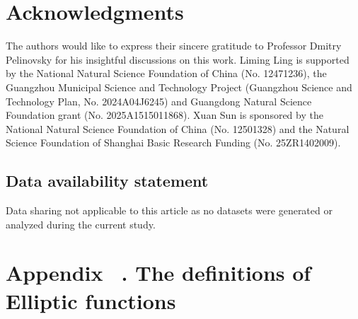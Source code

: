 \documentclass[11pt,reqno]{amsart}
\numberwithin{equation}{section}
\begin{document}
\section*{Acknowledgments}
The authors would like to express their sincere gratitude to Professor Dmitry Pelinovsky for his insightful discussions on this work.
Liming Ling is supported by the National Natural Science Foundation of China (No. 12471236), the Guangzhou Municipal Science and Technology Project (Guangzhou Science and Technology Plan, No. 2024A04J6245) and Guangdong Natural Science Foundation grant (No. 2025A1515011868).
Xuan Sun is sponsored by the National Natural Science Foundation of China (No. 12501328) and the Natural Science Foundation of Shanghai Basic Research Funding (No. 25ZR1402009).

\subsection*{Data availability statement}
Data sharing not applicable to this article as no datasets were generated or analyzed during the current study.

\appendix

\titleformat{\section}[display]
{\centering\LARGE\bfseries}{ }{11pt}{\LARGE}

\titleformat{\subsection}[display]
{\large\bfseries}{ }{10pt}{\large}

\renewcommand{\appendixname}{Appendix \, }


\section{\appendixname. The definitions of Elliptic functions}\label{appendix:Elliptic-integrals-formulas}

\setcounter{equation}{0}
\setcounter{define}{0}
\setcounter{prop}{0}
\setcounter{lemma}{0}

\renewcommand\theequation{\Alph{section}.\arabic{equation}}
\renewcommand\thedefine{\Alph{section}.\arabic{define}}
\renewcommand\theprop{\Alph{section}.\arabic{prop}}
\renewcommand\thelemma{\Alph{section}.\arabic{lemma}}
\end{document}
